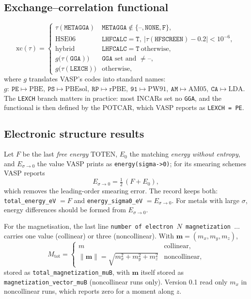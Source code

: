 \documentclass[11pt,a4paper]{article}
\newcommand{\vtag}[1]{\texttt{#1}}
\newcommand{\code}[1]{\texttt{#1}}
\begin{document}
\subsection{Exchange--correlation functional}
\begin{equation}
 \mathrm{xc}(\tau)=\begin{cases}
  \tau(\vtag{METAGGA}) & \vtag{METAGGA}\notin\{\texttt{--},\texttt{NONE},\texttt{F}\},\\
  \text{HSE06} & \vtag{LHFCALC}=\texttt{T},\ |\tau(\vtag{HFSCREEN})-0.2|<10^{-6},\\
  \text{hybrid} & \vtag{LHFCALC}=\texttt{T}\ \text{otherwise},\\
  g\bigl(\tau(\vtag{GGA})\bigr) & \vtag{GGA} \text{ set and } \neq\texttt{--},\\
  g\bigl(\tau(\vtag{LEXCH})\bigr) & \text{otherwise},
 \end{cases}
\end{equation}
where \(g\) translates VASP's codes into standard names:
\(g:\ \texttt{PE}\mapsto\text{PBE},\ \texttt{PS}\mapsto\text{PBEsol},\ \texttt{RP}\mapsto\text{rPBE},\ \texttt{91}\mapsto\text{PW91},\ \texttt{AM}\mapsto\text{AM05},\ \texttt{CA}\mapsto\text{LDA}\).
The \vtag{LEXCH} branch matters in practice: most INCARs set no \vtag{GGA}, and the functional is then
defined by the POTCAR, which VASP reports as \code{LEXCH = PE}.

\subsection{Electronic structure results}
Let \(F\) be the last \emph{free energy} \(\mathrm{TOTEN}\), \(E_0\) the matching \emph{energy without entropy},
and \(E_{\sigma\to0}\) the value VASP prints as \code{energy(sigma->0)}; for its smearing schemes VASP reports
\begin{equation}
  E_{\sigma\to 0} = \tfrac12\,(F + E_0),
\end{equation}
which removes the leading-order smearing error. The record keeps both:
\code{total\_energy\_eV} \(=F\) and \code{energy\_sigma0\_eV} \(=E_{\sigma\to0}\). For metals with large
\(\sigma\), energy differences should be formed from \(E_{\sigma\to0}\).

For the magnetisation, the last line \code{number of electron \(N\) magnetization \(\dots\)} carries one value
(collinear) or three (noncollinear). With \(\mathbf m=(m_x,m_y,m_z)\),
\begin{equation}
 M_{\mathrm{tot}}=\begin{cases} m & \text{collinear},\\ \lVert\mathbf m\rVert=\sqrt{m_x^2+m_y^2+m_z^2} & \text{noncollinear},\end{cases}
\end{equation}
stored as \code{total\_magnetization\_muB}, with \(\mathbf m\) itself stored as \code{magnetization\_vector\_muB}
(noncollinear runs only).
Version 0.1 read only \(m_x\) in noncollinear runs, which reports zero for a moment along \(z\).
\end{document}

